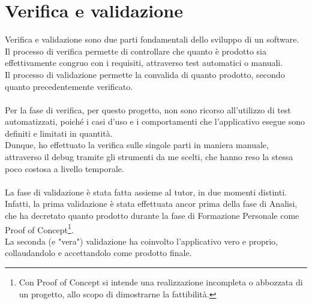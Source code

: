 \chapter{Verifica e validazione}
\label{cap:verifica-validazione}

Verifica e validazione sono due parti fondamentali dello sviluppo di un software.\\
Il processo di verifica permette di controllare che quanto è prodotto sia effettivamente congruo con i requisiti, attraverso test automatici o manuali.\\
Il processo di validazione permette la convalida di quanto prodotto, secondo quanto precedentemente verificato.\\\\
Per la fase di verifica, per questo progetto, non sono ricorso all'utilizzo di test automatizzati, poiché i casi d'uso e i comportamenti che l'applicativo esegue sono definiti e limitati in quantità.\\
Dunque, ho effettuato la verifica sulle singole parti in maniera manuale, attraverso il debug tramite gli strumenti da me scelti, che hanno reso la stessa poco costosa a livello temporale.\\\\
La fase di validazione è stata fatta assieme al tutor, in due momenti distinti.\\
Infatti, la prima validazione è stata effettuata ancor prima della fase di Analisi, che ha decretato quanto prodotto durante la fase di Formazione Personale come Proof of Concept\footnote{Con Proof of Concept si intende una realizzazione incompleta o abbozzata di un progetto, allo scopo di dimostrarne la fattibilità.}.\\
La seconda (e "vera") validazione ha coinvolto l'applicativo vero e proprio, collaudandolo e accettandolo come prodotto finale.
